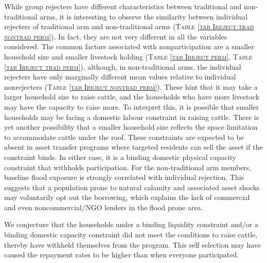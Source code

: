 	While group rejecters have different characteristics between \textsf{traditional} and non-\textsf{traditional} arms, it is interesting to observe the similarity between individual rejecters of \textsf{traditional} arm and non-\textsf{traditional} arms (\textsc{\normalsize Table \ref{tab Ireject trad nontrad perm}}). In fact, they are not very different in all the variables considered. %
	The common factors associated with nonparticipation are a smaller household size and smaller livestock holding (\textsc{\normalsize Table \ref{tab Ireject perm}}, \textsc{\normalsize Table \ref{tab Ireject trad perm}}), although, in non-\textsf{traditional} arms, the individual rejecters have only marginally different mean values relative to individual nonrejecters (\textsc{\normalsize Table \ref{tab Ireject nontrad perm}}). These hint that it may take a larger household size to raise cattle, and the households who have more livestock may have the capacity to raise more. To interpret this, it is possible that smaller households may be facing a domestic labour constraint in raising cattle. There is yet another possibility that a smaller household size reflects the space limitation to accommodate cattle under the roof. These constraints are expected to be absent in asset transfer programs where targeted residents can sell the asset if the constraint binds. In either case, it is a binding domestic physical capacity constraint that withholds participation. For the non-\textsf{traditional} arm members, baseline flood exposure is strongly correlated with individual rejection. This suggests that a population prone to natural calamity and associated asset shocks may voluntarily opt out the borrowing, which explains the lack of commercial and even noncommercial/NGO lenders in the flood prone area. 

	We conjecture that the households under a binding liquidity constraint and/or a binding domestic capacity constraint did not meet the conditions to raise cattle, thereby have withheld themselves from the program. This self selection may have caused the repayment rates to be higher than when everyone participated. 
	
